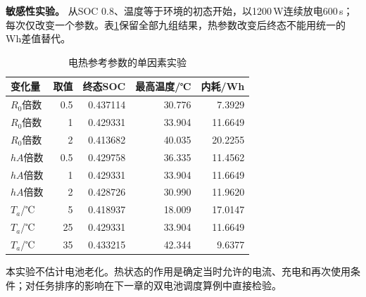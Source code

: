 \textbf{敏感性实验。} 从SOC 0.8、温度等于环境的初态开始，以1200\,W连续放电600\,s；每次仅改变一个参数。表\ref{tab:battery_sensitivity}保留全部九组结果，热参数改变后终态不能用统一的Wh差值替代。
\begin{table}[!ht]\centering
\caption{电热参考参数的单因素实验}\label{tab:battery_sensitivity}
\begin{tabular}{lrrrr}\toprule
变化量 & 取值 & 终态SOC & 最高温度/℃ & 内耗/Wh\\\midrule
$R_0$倍数 & 0.5 & 0.437114 & 30.776 & 7.3929\\
$R_0$倍数 & 1 & 0.429331 & 33.904 & 11.6649\\
$R_0$倍数 & 2 & 0.413682 & 40.035 & 20.2255\\
$hA$倍数 & 0.5 & 0.429758 & 36.335 & 11.4562\\
$hA$倍数 & 1 & 0.429331 & 33.904 & 11.6649\\
$hA$倍数 & 2 & 0.428726 & 30.990 & 11.9620\\
$T_a$/℃ & 5 & 0.418937 & 18.009 & 17.0147\\
$T_a$/℃ & 25 & 0.429331 & 33.904 & 11.6649\\
$T_a$/℃ & 35 & 0.433215 & 42.344 & 9.6377\\
\bottomrule\end{tabular}
\end{table}
本实验不估计电池老化。热状态的作用是确定当时允许的电流、充电和再次使用条件；对任务排序的影响在下一章的双电池调度算例中直接检验。
